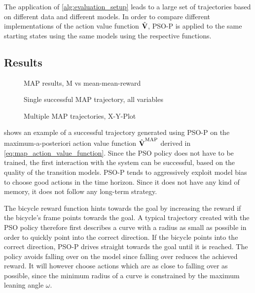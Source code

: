 The application of \cref{alg:evaluation_setup} leads to a large set of trajectories based on different data and different models.
In order to compare different implementations of the action value function $\operatorname{\hat{\operatorname{\mathbf{V}}}}$, PSO-P is applied to the same starting states using the same models using the respective functions.

\subsection{Results}
\begin{figure}[tp]
    \centering
    \caption{MAP results, M vs mean-mean-reward}
    \label{fig:map_results}
\end{figure}
\begin{figure}[tp]
    \centering
    \caption{Single successful MAP trajectory, all variables}
    \label{fig:map_successful_trajectory}
\end{figure}
\begin{figure}[p]
    \centering
    \caption{Multiple MAP trajectories, X-Y-Plot}
    \label{fig:map_trajectories}
\end{figure}
 shows an example of a successful trajectory generated using PSO-P on the maximum-a-posteriori action value function $\operatorname{\hat{\operatorname{\mathbf{V}}}}^{\text{MAP}}$ derived in \cref{eq:map_action_value_function}.
Since the PSO policy does not have to be trained, the first interaction with the system can be successful, based on the quality of the transition models.
PSO-P tends to aggressively exploit model bias to choose good actions in the time horizon.
Since it does not have any kind of memory, it does not follow any long-term strategy.

The bicycle reward function hints towards the goal by increasing the reward if the bicycle's frame points towards the goal.
A typical trajectory created with the PSO policy therefore first describes a curve with a radius as small as possible in order to quickly point into the correct direction.
If the bicycle points into the correct direction, PSO-P drives straight towards the goal until it is reached.
The policy avoids falling over on the model since falling over reduces the achieved reward.
It will however choose actions which are as close to falling over as possible, since the minimum radius of a curve is constrained by the maximum leaning angle $\omega$.

